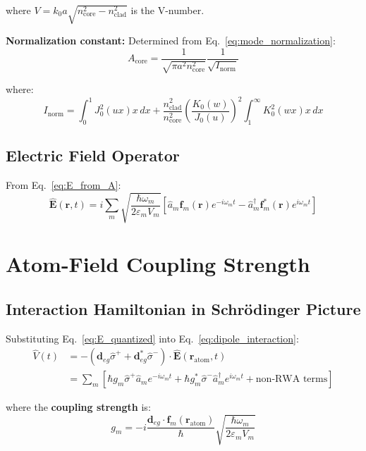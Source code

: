 \documentclass[12pt,a4paper]{article}
\begin{document}
where $V = k_0 a \sqrt{n_{\text{core}}^2 - n_{\text{clad}}^2}$ is the V-number.

\textbf{Normalization constant:} Determined from Eq.~\eqref{eq:mode_normalization}:
\begin{equation}
A_{\text{core}} = \frac{1}{\sqrt{\pi a^2 n_{\text{core}}^2}} \frac{1}{\sqrt{I_{\text{norm}}}}
\end{equation}

where:
\begin{equation}
I_{\text{norm}} = \int_0^1 J_0^2(ux) x \, dx + \frac{n_{\text{clad}}^2}{n_{\text{core}}^2}\left(\frac{K_0(w)}{J_0(u)}\right)^2 \int_1^\infty K_0^2(wx) x \, dx
\end{equation}

\subsection{Electric Field Operator}

From Eq.~\eqref{eq:E_from_A}:
\begin{equation}
\hat{\mathbf{E}}(\mathbf{r}, t) = i\sum_m \sqrt{\frac{\hbar\omega_m}{2\varepsilon_m V_m}} \left[\hat{a}_m \mathbf{f}_m(\mathbf{r})e^{-i\omega_m t} - \hat{a}_m^\dagger \mathbf{f}_m^*(\mathbf{r})e^{i\omega_m t}\right] \label{eq:E_quantized}
\end{equation}

\section{Atom-Field Coupling Strength}

\subsection{Interaction Hamiltonian in Schrödinger Picture}

Substituting Eq.~\eqref{eq:E_quantized} into Eq.~\eqref{eq:dipole_interaction}:
\begin{align}
\hat{V}(t) &= -(\mathbf{d}_{eg}\hat{\sigma}^+ + \mathbf{d}_{eg}^*\hat{\sigma}^-) \cdot \hat{\mathbf{E}}(\mathbf{r}_{\text{atom}}, t) \nonumber\\
&= \sum_m \left[\hbar g_m \hat{\sigma}^+ \hat{a}_m e^{-i\omega_m t} + \hbar g_m^* \hat{\sigma}^- \hat{a}_m^\dagger e^{i\omega_m t} + \text{non-RWA terms}\right] \label{eq:V_full}
\end{align}

where the \textbf{coupling strength} is:
\begin{equation}
g_m = -i\frac{\mathbf{d}_{eg} \cdot \mathbf{f}_m(\mathbf{r}_{\text{atom}})}{\hbar} \sqrt{\frac{\hbar\omega_m}{2\varepsilon_m V_m}} \label{eq:coupling_general}
\end{equation}
\end{document}
